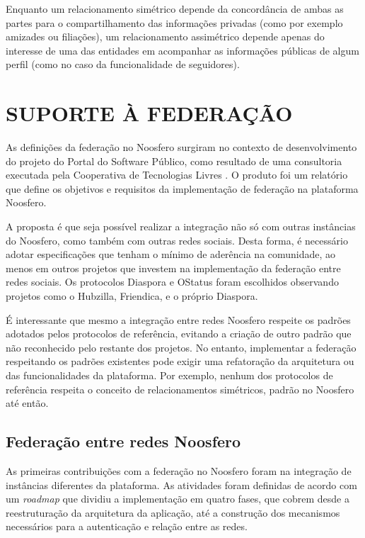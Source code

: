 Enquanto um relacionamento simétrico depende da concordância de ambas as partes para
o compartilhamento das informações privadas (como por exemplo amizades ou
filiações), um relacionamento assimétrico depende apenas do interesse de uma das
entidades em acompanhar as informações públicas de algum perfil (como no caso da
funcionalidade de seguidores).



\section{SUPORTE À FEDERAÇÃO}

As definições da federação no Noosfero surgiram no contexto de desenvolvimento do
projeto do Portal do Software Público, como resultado de uma consultoria executada
pela Cooperativa de Tecnologias Livres \cite{colivre2016}. O produto foi um
relatório que define os objetivos e requisitos da implementação de federação na
plataforma Noosfero.

A proposta é que seja possível realizar a integração não só com outras instâncias do
Noosfero, como também com outras redes sociais. Desta forma, é necessário adotar
especificações que tenham o mínimo de aderência na comunidade, ao menos em outros
projetos que investem na implementação da federação entre redes sociais. Os
protocolos Diaspora e OStatus foram escolhidos observando projetos como o Hubzilla,
Friendica, e o próprio Diaspora.

É interessante que mesmo a integração entre redes Noosfero respeite os padrões
adotados pelos protocolos de referência, evitando a criação de outro padrão que não
reconhecido pelo restante dos projetos. No entanto, implementar a federação
respeitando os padrões existentes pode exigir uma refatoração da arquitetura ou das
funcionalidades da plataforma. Por exemplo, nenhum dos protocolos de referência
respeita o conceito de relacionamentos simétricos, padrão no Noosfero até então.


\subsection{Federação entre redes Noosfero}

As primeiras contribuições com a federação no Noosfero foram na integração de
instâncias diferentes da plataforma. As atividades foram definidas de acordo com
um \textit{roadmap} que dividiu a implementação em quatro fases, que cobrem desde
a reestruturação da arquitetura da aplicação, até a construção dos mecanismos
necessários para a autenticação e relação entre as redes.

